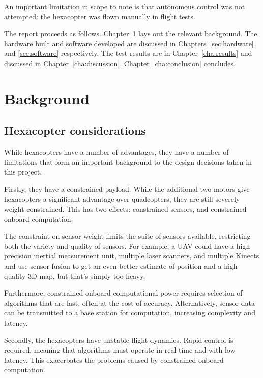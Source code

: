 \documentclass[12pt,oneside,a4paper]{book}
\begin{document}
An important limitation in scope to note is that autonomous control
was not attempted: the hexacopter was flown manually in flight tests.

The report proceeds as follows. 
Chapter~\ref{cha:background} lays out the relevant background. The
hardware built and software developed are discussed in
Chapters~\ref{sec:hardware} and \ref{sec:software} respectively. The
test results are in Chapter~\ref{cha:results} and discussed in
Chapter~\ref{cha:discussion}. Chapter~\ref{cha:conclusion} concludes.

\chapter{Background}
\label{cha:background}

\section{Hexacopter considerations}
\label{sec:hexac-cons}

While hexacopters have a number of advantages, they have a number of
limitations that form an important background to the design decisions
taken in this project.

Firstly, they have a constrained payload. While the additional two
motors give hexacopters a significant advantage over quadcopters, they
are still severely weight constrained. This has two effects:
constrained sensors, and constrained onboard computation.

The constraint on sensor weight limits the suite of sensors available,
restricting both the variety and quality of sensors. For example, a
UAV could have a high precision inertial measurement unit, multiple
laser scanners, and multiple Kinects and use sensor fusion to get an
even better estimate of position and a high quality 3D map, but that's
simply too heavy.

Furthermore, constrained onboard computational power requires
selection of algorithms that are fast, often at the cost of
accuracy. Alternatively, sensor data can be transmitted to a base
station for computation, increasing complexity and latency.

Secondly, the hexacopters have unstable flight dynamics. Rapid control
is required, meaning that algorithms must operate in real time and
with low latency. This exacerbates the problems caused by constrained
onboard computation.
\end{document}

